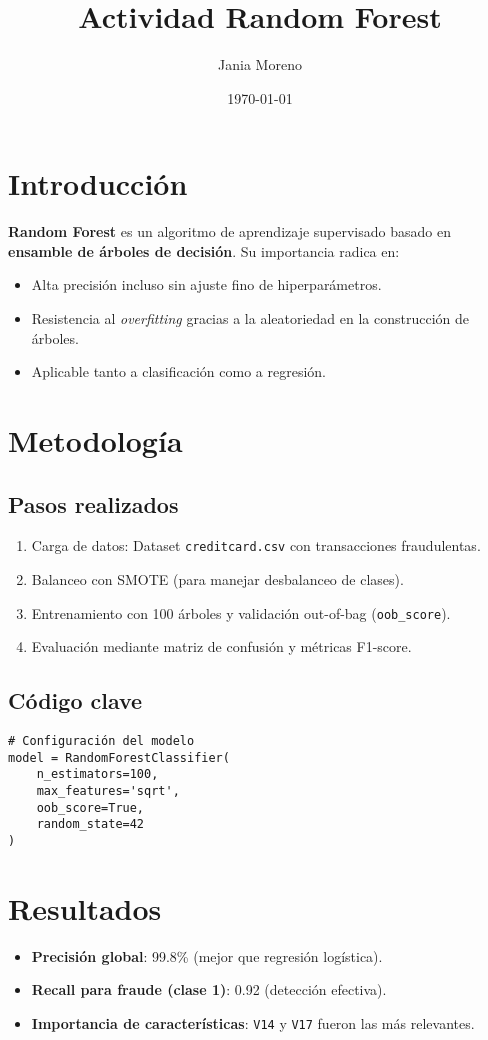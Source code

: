 \documentclass{article}
\title{Actividad Random Forest}
\author{Jania Moreno}
\date{\today}
\begin{document}
\maketitle

\section{Introducción}
\textbf{Random Forest} es un algoritmo de aprendizaje supervisado basado en \textbf{ensamble de árboles de decisión}. Su importancia radica en:
\begin{itemize}
    \item Alta precisión incluso sin ajuste fino de hiperparámetros.
    \item Resistencia al \textit{overfitting} gracias a la aleatoriedad en la construcción de árboles.
    \item Aplicable tanto a clasificación como a regresión.
\end{itemize}

\section{Metodología}
\subsection{Pasos realizados}
\begin{enumerate}
    \item Carga de datos: Dataset \texttt{creditcard.csv} con transacciones fraudulentas.
    \item Balanceo con SMOTE (para manejar desbalanceo de clases).
    \item Entrenamiento con 100 árboles y validación out-of-bag (\texttt{oob\_score}).
    \item Evaluación mediante matriz de confusión y métricas F1-score.
\end{enumerate}

\subsection{Código clave}
\begin{lstlisting}
# Configuración del modelo
model = RandomForestClassifier(
    n_estimators=100,
    max_features='sqrt',
    oob_score=True,
    random_state=42
)
\end{lstlisting}

\section{Resultados}
\begin{itemize}
    \item \textbf{Precisión global}: 99.8\% (mejor que regresión logística).
    \item \textbf{Recall para fraude (clase 1)}: 0.92 (detección efectiva).
    \item \textbf{Importancia de características}: \texttt{V14} y \texttt{V17} fueron las más relevantes.
\end{itemize}
\end{document}
